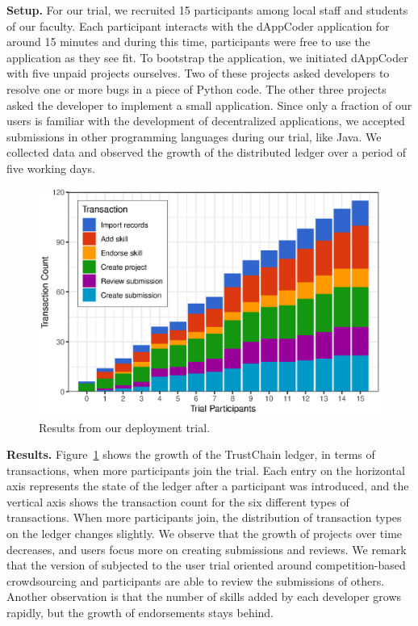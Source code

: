 \textbf{Setup.}
For our trial, we recruited 15 participants among local staff and students of our faculty.
Each participant interacts with the dAppCoder application for around 15 minutes and during this time, participants were free to use the application as they see fit.
To bootstrap the application, we initiated dAppCoder with five unpaid projects ourselves.
Two of these projects asked developers to resolve one or more bugs in a piece of Python code.
The other three projects asked the developer to implement a small application.
Since only a fraction of our users is familiar with the development of decentralized applications, we accepted submissions in other programming languages during our trial, like Java.
We collected data and observed the growth of the distributed ledger over a period of five working days.


\begin{figure}[t!]
	\centering
	\includegraphics[width=.75\columnwidth]{devid/resources/experiment/experiment_1_unit.eps}
	\caption{Results from our deployment trial.}
	\label{fig:experiment_graph}
\end{figure}

\textbf{Results.}
Figure~\ref{fig:experiment_graph} shows the growth of the TrustChain ledger, in terms of transactions, when more participants join the trial.
Each entry on the horizontal axis represents the state of the ledger after a participant was introduced, and the vertical axis shows the transaction count for the six different types of transactions.
When more participants join, the distribution of transaction types on the ledger changes slightly.
We observe that the growth of projects over time decreases, and users focus more on creating submissions and reviews.
We remark that the version of \Dappcoder{} subjected to the user trial oriented around competition-based crowdsourcing and participants are able to review the submissions of others.
Another observation is that the number of skills added by each developer grows rapidly, but the growth of endorsements stays behind.

